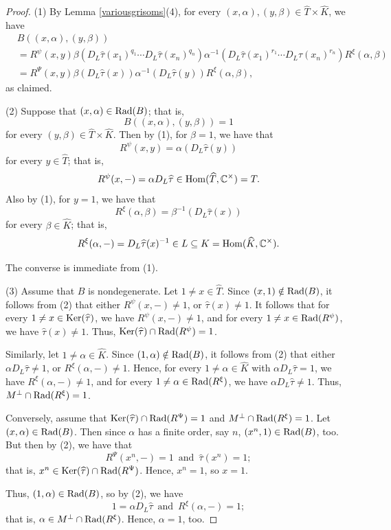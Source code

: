 \documentclass{amsart}
\theoremstyle{definition}
\newcommand{\Hom}{{\rm Hom}}
\numberwithin{equation}{section}
\begin{document}
\begin{proof}
(1) By Lemma \ref{variousgrisoms}(4), for every $(x,\alpha),(y,\beta)\in \widehat{T}\times \widehat{K}$, we have
\begin{equation*}
\begin{split}
& B((x,\alpha),(y,\beta))\\
& =R^{\psi}(x,y)\beta(D_L\widehat{\tau}(x_1)^{q_1}\cdots D_L\widehat{\tau}(x_n)^{q_n})\alpha^{-1}(D_L\widehat{\tau}(x_1)^{r_1}\cdots D_L\widehat{\tau}(x_n)^{r_n}) R^{\xi}(\alpha,\beta)\\
& =R^{\Psi}(x,y) \beta(D_L\widehat{\tau}(x))\alpha^{-1}(D_L\widehat{\tau}(y)) R^{\xi}(\alpha,\beta),
\end{split}
\end{equation*}
as claimed.

(2) Suppose that $(x,\alpha)\in {\rm Rad}(B)$; 
that is, 
$$B((x,\alpha),(y,\beta))=1$$
for every $(y,\beta)\in \widehat{T}\times \widehat{K}$.  
Then by (1), for $\beta=1$, we have that
$$R^{\psi}(x,y)=\alpha(D_L\widehat{\tau}(y))$$
for every $y\in \widehat{T}$; that is, 
$$R^{\psi}(x,-)=\alpha D_L\widehat{\tau}\in \Hom(\widehat{T},\mathbb{C}^{\times})=T.$$
Also by (1), for $y=1$, we have that
$$R^{\xi}(\alpha,\beta)=\beta^{-1}(D_L\widehat{\tau}(x))$$
for every $\beta\in \widehat{K}$; that is, 
$$R^{\xi}(\alpha,-)=D_L\widehat{\tau}(x)^{-1}\in L\subseteq K=\Hom(\widehat{K},\mathbb{C}^{\times}).$$

The converse is immediate from (1). 

(3) Assume that $B$ is nondegenerate. Let $1\ne x\in \widehat{T}$. Since $(x,1)\notin {\rm Rad}(B)$, it follows from (2) that either $R^{\psi}(x,-)\ne 1$, 
or  
$\widehat{\tau}(x)\ne 1$. It follows that for every $1\ne x\in {\rm Ker}(\widehat{\tau})$, we have $R^{\psi}(x,-)\ne 1$, and for every $1\ne x\in {\rm Rad}(R^{\psi})$, we have $\widehat{\tau}(x)\ne 1$. Thus, ${\rm Ker}(\widehat{\tau})\cap {\rm Rad}(R^{\psi})=1$.

Similarly, let $1\ne \alpha\in \widehat{K}$. Since $(1,\alpha)\notin {\rm Rad}(B)$, it follows from (2) that either $\alpha D_L\widehat{\tau}\ne 1$,  
or $R^{\xi}(\alpha,-)\ne 1$. Hence, for every $1\ne \alpha\in \widehat{K}$ with $\alpha D_L\widehat{\tau}=1$, we have $R^{\xi}(\alpha,-)\ne 1$, 
and for every $1\ne \alpha\in {\rm Rad}(R^{\xi})$, we have $\alpha D_L\widehat{\tau}\ne 1$. Thus, $M^{\perp}\cap {\rm Rad}(R^{\xi})=1$.

Conversely, assume that ${\rm Ker}(\widehat{\tau})\cap {\rm Rad}(R^{\Psi})=1$ and $M^{\perp}\cap {\rm Rad}(R^{\xi})=1$. Let $(x,\alpha)\in {\rm Rad}(B)$. Then since $\alpha$ has a finite order, say $n$, $(x^n,1)\in {\rm Rad}(B)$, too.
But then by (2), we have that
$$R^{\Psi}(x^n,-)=1\,\,\,\text{and}\,\,\,\widehat{\tau}(x^n)=1;$$
that is, $x^n\in {\rm Ker}(\widehat{\tau})\cap {\rm Rad}(R^{\Psi})$. Hence, $x^n=1$, so $x=1$.

Thus, $(1,\alpha)\in {\rm Rad}(B)$, so by (2), we have
$$1=\alpha D_L\widehat{\tau}\,\,\,\text{and}\,\,\,R^{\xi}(\alpha,-)=1;$$
that is, $\alpha\in M^{\perp}\cap {\rm Rad}(R^{\xi})$. Hence, $\alpha=1$, too.
\end{proof}
\end{document}
